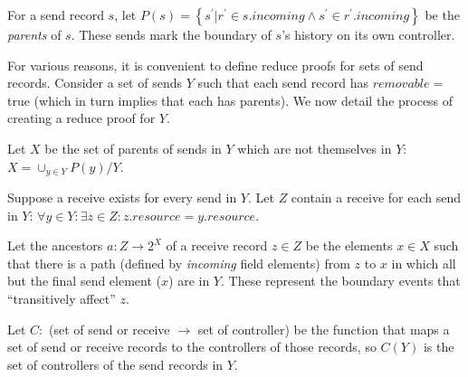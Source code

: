 \documentclass[a4paper,USenglish,cleveref, autoref, thm-restate, anonymous]{lipics-v2021}
\newcommand{\p}[1]{{\ensuremath{\left({{#1}}\right)}}}
\newcommand{\cb}[1]{{\left\{{{#1}}\right\}}}
\begin{document}
For a send record $s$, let $P\p s = \cb{s^\prime | r^\prime \in s.incoming \land s^\prime \in r^\prime.incoming}$ be the \emph{parents} of $s$.
These sends mark the boundary of $s$'s history on its own controller. 

For various reasons, it is convenient to define reduce proofs for sets of send records. 
Consider a set of sends $Y$ such that each send record has $removable=$true (which in turn implies that each has parents). 
We now detail the process of creating a reduce proof for $Y$. 

Let $X$ be the set of parents of sends in $Y$ which are not themselves in $Y$: $X = \cup_{y\in Y}P\p y / Y$.

Suppose a receive exists for every send in $Y$.
Let $Z$ contain a receive for each send in $Y$: $\forall y\in Y: \exists z\in Z : z.resource = y.resource$. 

Let the ancestors $a : Z \rightarrow 2^X$ of a receive record $z\in Z$ be the elements $x\in X$ such that there is a path (defined by \emph{incoming} field elements) from $z$ to $x$ in which all but the final send element ($x$) are in $Y$. 
These represent the boundary events that ``transitively affect'' $z$. 

Let $C: $ (set of send or receive $\rightarrow$ set of controller) be the function that maps a set of send or receive records to the controllers of those records, so $C\p Y$ is the set of controllers of the send records in $Y$. 
\end{document}
